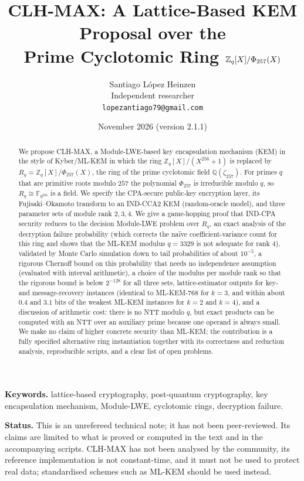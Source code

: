 \documentclass[11pt]{article}
\title{CLH-MAX: A Lattice-Based KEM Proposal over the\\ Prime Cyclotomic Ring $\Z_q[X]/\Phi_{257}(X)$}
\author{Santiago L\'opez Heinzen\\
Independent researcher\\
\texttt{lopezantiago79@gmail.com}}
\date{November 2026 (version 2.1.1)}
\theoremstyle{remark}
\newcommand{\Z}{\mathbb{Z}}
\newcommand{\F}{\mathbb{F}}
\newcommand{\Rq}{R_q}
\begin{document}
\maketitle
\begin{abstract}
We propose CLH-MAX, a Module-LWE-based key encapsulation mechanism (KEM) in the style of Kyber/ML-KEM in which the ring $\Z_q[X]/(X^{256}+1)$ is replaced by $\Rq=\Z_q[X]/\Phi_{257}(X)$, the ring of the prime cyclotomic field $\mathbb{Q}(\zeta_{257})$. For primes $q$ that are primitive roots modulo $257$ the polynomial $\Phi_{257}$ is irreducible modulo $q$, so $\Rq\cong\F_{q^{256}}$ is a field. We specify the CPA-secure public-key encryption layer, its Fujisaki--Okamoto transform to an IND-CCA2 KEM (random-oracle model), and three parameter sets of module rank $2,3,4$. We give a game-hopping proof that IND-CPA security reduces to the decision Module-LWE problem over $\Rq$, an exact analysis of the decryption failure probability (which corrects the na\"ive coefficient-variance count for this ring and shows that the ML-KEM modulus $q=3329$ is not adequate for rank $4$), validated by Monte Carlo simulation down to tail probabilities of about $10^{-5}$, a rigorous Chernoff bound on this probability that needs no independence assumption (evaluated with interval arithmetic), a choice of the modulus per module rank so that the rigorous bound is below $2^{-128}$ for all three sets, lattice-estimator outputs for key- and message-recovery instances (identical to ML-KEM-768 for $k=3$, and within about $0.4$ and $3.1$ bits of the weakest ML-KEM instances for $k=2$ and $k=4$), and a discussion of arithmetic cost: there is no NTT modulo $q$, but exact products can be computed with an NTT over an auxiliary prime because one operand is always small. We make no claim of higher concrete security than ML-KEM; the contribution is a fully specified alternative ring instantiation together with its correctness and reduction analysis, reproducible scripts, and a clear list of open problems.
\end{abstract}

\noindent\textbf{Keywords.} lattice-based cryptography, post-quantum cryptography, key encapsulation mechanism, Module-LWE, cyclotomic rings, decryption failure.

\noindent\textbf{Status.} This is an unrefereed technical note; it has not been peer-reviewed. Its claims are limited to what is proved or computed in the text and in the accompanying scripts. CLH-MAX has not been analysed by the community, its reference implementation is not constant-time, and it must not be used to protect real data; standardised schemes such as ML-KEM should be used instead.
\end{document}
